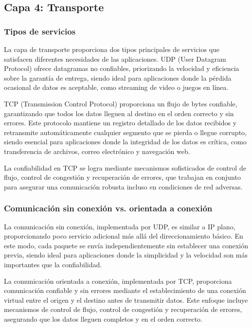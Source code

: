 \subsection{Capa 4: Transporte}

\subsubsection{Tipos de servicios}

La capa de transporte proporciona dos tipos principales de servicios que satisfacen diferentes necesidades de las aplicaciones. UDP (User Datagram Protocol) ofrece datagramas no confiables, priorizando la velocidad y eficiencia sobre la garantía de entrega, siendo ideal para aplicaciones donde la pérdida ocasional de datos es aceptable, como streaming de video o juegos en línea.

TCP (Transmission Control Protocol) proporciona un flujo de bytes confiable, garantizando que todos los datos lleguen al destino en el orden correcto y sin errores. Este protocolo mantiene un registro detallado de los datos recibidos y retransmite automáticamente cualquier segmento que se pierda o llegue corrupto, siendo esencial para aplicaciones donde la integridad de los datos es crítica, como transferencia de archivos, correo electrónico y navegación web.

La confiabilidad en TCP se logra mediante mecanismos sofisticados de control de flujo, control de congestión y recuperación de errores, que trabajan en conjunto para asegurar una comunicación robusta incluso en condiciones de red adversas.

\subsubsection{Comunicación sin conexión vs. orientada a conexión}

La comunicación sin conexión, implementada por UDP, es similar a IP plano, proporcionando poco servicio adicional más allá del direccionamiento básico. En este modo, cada paquete se envía independientemente sin establecer una conexión previa, siendo ideal para aplicaciones donde la simplicidad y la velocidad son más importantes que la confiabilidad.

La comunicación orientada a conexión, implementada por TCP, proporciona comunicación confiable y sin errores mediante el establecimiento de una conexión virtual entre el origen y el destino antes de transmitir datos. Este enfoque incluye mecanismos de control de flujo, control de congestión y recuperación de errores, asegurando que los datos lleguen completos y en el orden correcto.

